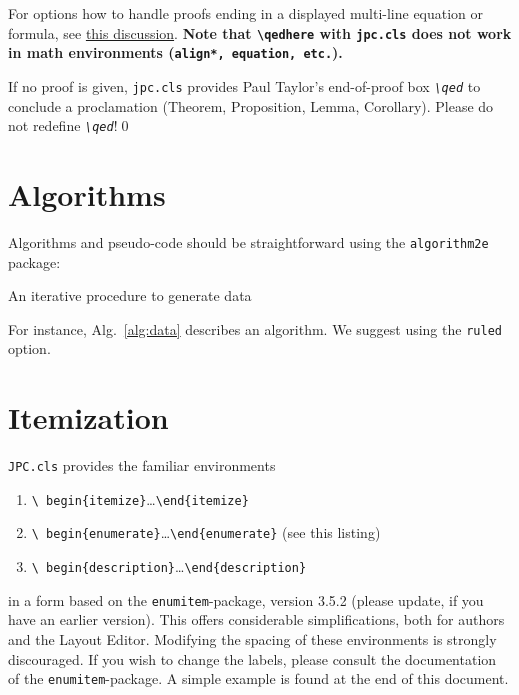 \documentclass{jpc} %
\theoremstyle{plain}\newtheorem{satz}[thm]{Satz} %
\begin{document}
  For options how to handle proofs ending in a displayed multi-line
  equation or formula, see
  \href{http://tex.stackexchange.com/questions/101929/qed-or-qedhere-at-the-end-of-split-environment}{this
    discussion}. \textbf{Note that  \texttt{\textbackslash qedhere} with \texttt{jpc.cls} does not work in math environments (\texttt{align*, equation, etc.}). }

\begin{cor}\label{C:big}
  If no proof is given, \texttt{jpc.cls} provides Paul Taylor's
  end-of-proof box \emph{\texttt{\textbackslash qed}} to conclude a
  proclamation (Theorem, Proposition, Lemma, Corollary).  Please do
  not redefine \emph{\texttt{\textbackslash qed}}!\qed
\end{cor}

\section{Algorithms}\label{S:algo}
Algorithms and pseudo-code should be straightforward using the \texttt{algorithm2e} package:


\begin{algorithm}[H]

 \caption{An iterative procedure to generate data}
 \label{alg:data}
\end{algorithm}

\noindent For instance, Alg.~\ref{alg:data} describes an algorithm. We suggest using the \texttt{ruled} option.

\section{Itemization}\label{S:item}
  \texttt{JPC.cls} provides the familiar environments
\begin{enumerate}
\item\texttt{\textbackslash
  begin\{itemize\}}\dots\texttt{\textbackslash end\{itemize\}}
\item\texttt{\textbackslash
  begin\{enumerate\}}\dots\texttt{\textbackslash end\{enumerate\}}
  (see this listing)
\item\texttt{\textbackslash
    begin\{description\}}\dots\texttt{\textbackslash end\{description\}}
\end{enumerate}
  in a form based on the \texttt{enumitem}-package, version 3.5.2
  (please update, if you have an earlier version).  This offers
  considerable simplifications, both for authors and the Layout
  Editor.  Modifying the spacing of these environments is strongly
  discouraged.  If you wish to change the labels, please consult the
  documentation of the \texttt{enumitem}-package.  A simple example is
  found at the end of this document.
\end{document}
